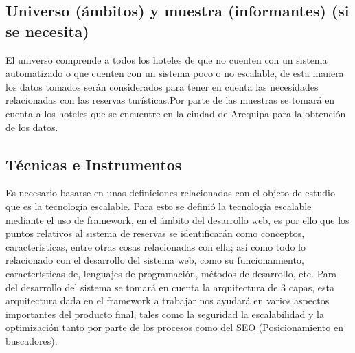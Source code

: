 \documentclass[12pt,a4paper,oneside]{article}
\begin{document}
\subsection{Universo (ámbitos) y muestra (informantes) (si se necesita)}
El universo comprende a todos los hoteles de que no cuenten con un sistema automatizado o que cuenten con un sistema poco o no escalable, de esta manera los datos tomados serán considerados para tener en cuenta las necesidades relacionadas con las reservas turísticas.Por parte de las muestras se tomará en cuenta a los hoteles que se encuentre en la ciudad de Arequipa para la obtención de los datos. 
\subsection{Técnicas e Instrumentos}
Es necesario basarse en unas definiciones relacionadas con el objeto de estudio que es la tecnología escalable. Para esto se definió la tecnología escalable mediante el uso de framework, en el ámbito del desarrollo web, es por ello que los puntos relativos al sistema de reservas se identificarán como conceptos, características, entre otras cosas relacionadas con ella; así como todo lo relacionado con el desarrollo del sistema web, como su funcionamiento, características de, lenguajes de programación, métodos de desarrollo, etc. Para del desarrollo del sistema se tomará en cuenta la arquitectura de 3 capas, esta arquitectura dada en el framework a trabajar nos ayudará en varios aspectos importantes del producto final, tales como la seguridad la escalabilidad y la optimización tanto por parte de los procesos como del SEO (Posicionamiento en buscadores). 
\end{document}

